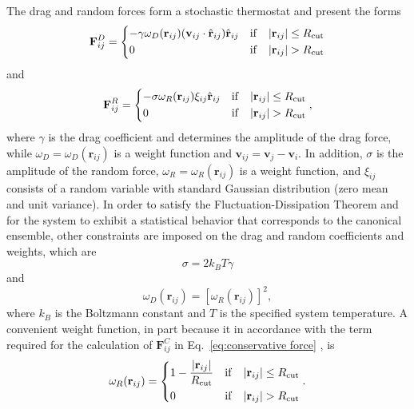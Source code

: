\documentclass[
journal=mamobx,
manuscript=article,
]{achemso}
\newcommand{\vt}[1]{\boldsymbol{\mathbf{#1}}}          %
\begin{document}
The drag and random forces form a stochastic thermostat and present the forms \cite{Groot_1997}
\begin{equation}
{\vt F}^D_{ij} = \begin{dcases}
-\gamma \omega_D({\vt r}_{ij}) ({\vt v}_{ij} \cdot \hat{\vt r}_{ij}) \hat{\vt r}_{ij} & \mathrm{if} \quad |{\vt r}_{ij}| \leq R_\mathrm{cut} \\
0 & \mathrm{if} \quad |{\vt r}_{ij}| > R_\mathrm{cut}
\end{dcases}
\end{equation}
and
\begin{equation}
{\vt F}^R_{ij} = \begin{dcases}
-\sigma \omega_R({\vt r}_{ij}) \xi_{ij} \hat{\vt r}_{ij} & \mathrm{if} \quad |{\vt r}_{ij}| \leq R_\mathrm{cut} \\
0 & \mathrm{if} \quad |{\vt r}_{ij}| > R_\mathrm{cut}
\end{dcases},
\end{equation}
where $\gamma$ is the drag coefficient and determines the amplitude of the drag force, while $\omega_D = \omega_D({\vt r}_{ij})$ is a weight function and ${\vt v}_{ij} = {\vt v}_j - {\vt v}_i$.
In addition, $\sigma$ is the amplitude of the random force, $\omega_R = \omega_R({\vt r}_{ij})$ is a weight function, and $\xi_{ij}$ consists of a random variable with standard Gaussian distribution (zero mean and unit variance).
In order to satisfy the Fluctuation-Dissipation Theorem and for the system to exhibit a statistical behavior that corresponds to the canonical ensemble, other constraints are imposed on the drag and random coefficients and weights, which are \cite{Espanol_1995}
\begin{equation}
\sigma = 2 k_B T \gamma
\end{equation}
and
\begin{equation}
\omega_D({\vt r}_{ij}) = \left[\omega_R({\vt r}_{ij})\right]^2,
\end{equation}
where $k_B$ is the Boltzmann constant and $T$ is the specified system temperature.
A convenient weight function, in part because it in accordance with the term required for the calculation of ${\vt F}^C_{ij}$ in Eq.~\eqref{eq:conservative force} \cite{Groot_1997}, is
\begin{equation}
\omega_R({\vt r}_{ij}) = \begin{dcases} 1 - \frac{|{\vt r}_{ij}|}{R_\mathrm{cut}} & \mathrm{if} \quad |{\vt r}_{ij}| \leq R_\mathrm{cut} \\
0 & \mathrm{if} \quad |{\vt r}_{ij}| > R_\mathrm{cut}
\end{dcases}.
\end{equation}
\end{document}
